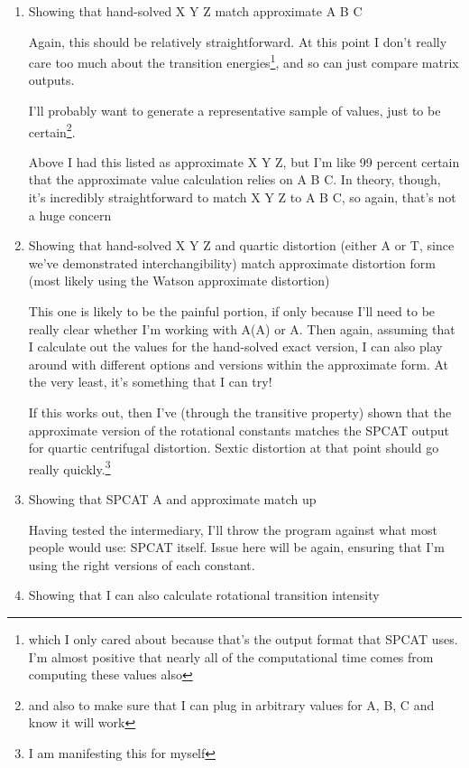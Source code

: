 \documentclass[12pt]{article}
\renewcommand{\,}{\textsuperscript{,}}
\begin{document}
\begin{enumerate}
At this point, I luckily no longer need to use SPCAT, which means that I get to save the half a gigabyte of storage that computing transitions takes up on my computer.  
That's probably offset by the amount of memory that my computer is using, but that's not something I have to manually clear, which is great.

\item Showing that hand-solved X Y Z match approximate A B C

Again, this should be relatively straightforward. At this point I don't really care too much about the transition energies\footnote{which I only cared about because that's the output format that SPCAT uses. I'm almost positive that nearly all of the computational time comes from computing these values also}, and so can just compare matrix outputs.

I'll probably want to generate a representative sample of values, just to be certain\footnote{and also to make sure that I can plug in arbitrary values for A, B, C and know it will work}.

Above I had this listed as approximate X Y Z, but I'm like 99 percent certain that the approximate value calculation relies on A B C.  
In theory, though, it's incredibly straightforward to match X Y Z to A B C, so again, that's not a huge concern

\item Showing that hand-solved X Y Z and quartic distortion (either A or T, since we've demonstrated interchangibility) match approximate distortion form (most likely using the Watson approximate distortion)

This one is likely to be the painful portion, if only because I'll need to be really clear whether I'm working with A(A) or A.  
Then again, assuming that I calculate out the values for the hand-solved exact version, I can also play around with different options and versions within the approximate form.  
At the very least, it's something that I can try!

If this works out, then I've (through the transitive property) shown that the approximate version of the rotational constants matches the SPCAT output for quartic centrifugal distortion.  
Sextic distortion at that point should go really quickly.\footnote{I am manifesting this for myself}  
\item Showing that SPCAT A and approximate match up

Having tested the intermediary, I'll throw the program against what most people would use: SPCAT itself.  
Issue here will be again, ensuring that I'm using the right versions of each constant.  
\item Showing that I can also calculate rotational transition intensity


\end{enumerate}
\end{document}
